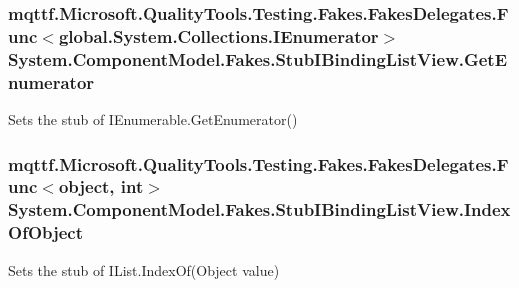 \hypertarget{class_system_1_1_component_model_1_1_fakes_1_1_stub_i_binding_list_view_a139df89e9c6fa1d8b4f66b003f61a84a}{
\subsubsection[{Get\-Enumerator}]{\setlength{\rightskip}{0pt plus 5cm}mqttf.\-Microsoft.\-Quality\-Tools.\-Testing.\-Fakes.\-Fakes\-Delegates.\-Func$<$global.\-System.\-Collections.\-I\-Enumerator$>$ System.\-Component\-Model.\-Fakes.\-Stub\-I\-Binding\-List\-View.\-Get\-Enumerator}}\label{class_system_1_1_component_model_1_1_fakes_1_1_stub_i_binding_list_view_a139df89e9c6fa1d8b4f66b003f61a84a}


Sets the stub of I\-Enumerable.\-Get\-Enumerator()

\hypertarget{class_system_1_1_component_model_1_1_fakes_1_1_stub_i_binding_list_view_ae01ce847d5d0c0f697a1a7f3ce6fa39e}{
\subsubsection[{Index\-Of\-Object}]{\setlength{\rightskip}{0pt plus 5cm}mqttf.\-Microsoft.\-Quality\-Tools.\-Testing.\-Fakes.\-Fakes\-Delegates.\-Func$<$object, int$>$ System.\-Component\-Model.\-Fakes.\-Stub\-I\-Binding\-List\-View.\-Index\-Of\-Object}}\label{class_system_1_1_component_model_1_1_fakes_1_1_stub_i_binding_list_view_ae01ce847d5d0c0f697a1a7f3ce6fa39e}


Sets the stub of I\-List.\-Index\-Of(\-Object value)

